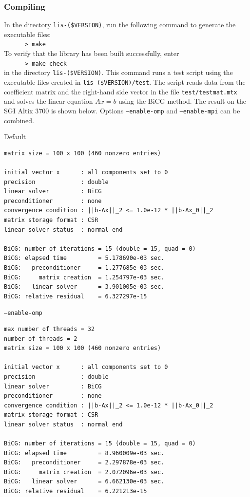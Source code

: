 \documentclass[a4paper]{article}
\begin{document}
\subsubsection{Compiling}
In the directory {\tt lis-(\$VERSION)}, run the following command to generate
the executable files: \\
 \verb+      > make +\\
To verify that the library has been built successfully, enter 
\\
 \verb+      > make check+\\
in the directory {\tt lis-(\$VERSION)}. 
This command runs a test script using the executable files created 
in {\tt lis-(\$VERSION)/test}. The script reads 
data from the coefficient matrix and the right-hand side vector 
in the file 
{\tt test/testmat.mtx} and solves the linear equation $Ax = b$ 
using the BiCG method. The result on the SGI Altix 3700 is
 shown below. Options {\tt --enable-omp} and {\tt --enable-mpi} can be combined.
\begin{itembox}[l]{Default}
 \begin{minipage}{10cm}
 \begin{verbatim}
matrix size = 100 x 100 (460 nonzero entries)

initial vector x      : all components set to 0
precision             : double
linear solver         : BiCG
preconditioner        : none
convergence condition : ||b-Ax||_2 <= 1.0e-12 * ||b-Ax_0||_2
matrix storage format : CSR
linear solver status  : normal end

BiCG: number of iterations = 15 (double = 15, quad = 0)
BiCG: elapsed time         = 5.178690e-03 sec.
BiCG:   preconditioner     = 1.277685e-03 sec. 
BiCG:     matrix creation  = 1.254797e-03 sec.
BiCG:   linear solver      = 3.901005e-03 sec.
BiCG: relative residual    = 6.327297e-15
 \end{verbatim}
 \end{minipage}
\end{itembox}
\begin{itembox}[l]{{\tt --enable-omp}}
 \begin{minipage}{10cm}
 \begin{verbatim}
max number of threads = 32
number of threads = 2
matrix size = 100 x 100 (460 nonzero entries)

initial vector x      : all components set to 0
precision             : double
linear solver         : BiCG
preconditioner        : none
convergence condition : ||b-Ax||_2 <= 1.0e-12 * ||b-Ax_0||_2
matrix storage format : CSR
linear solver status  : normal end

BiCG: number of iterations = 15 (double = 15, quad = 0)
BiCG: elapsed time         = 8.960009e-03 sec.
BiCG:   preconditioner     = 2.297878e-03 sec. 
BiCG:     matrix creation  = 2.072096e-03 sec.
BiCG:   linear solver      = 6.662130e-03 sec.
BiCG: relative residual    = 6.221213e-15
 \end{verbatim}
 \end{minipage}
\end{itembox}
\end{document}
